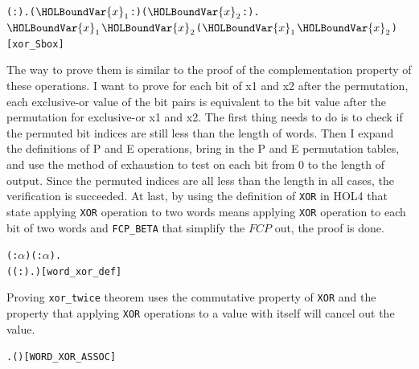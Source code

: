 \documentclass{article}
\begin{document}
\begin{alltt}
  \HOLTokenTurnstile{} \HOLSymConst{\HOLTokenForall{}}( :). \HOLSymConst{\HOLTokenExists{}}(\ensuremath{\HOLBoundVar{x}\sb{\mathrm{1}}} :) (\ensuremath{\HOLBoundVar{x}\sb{\mathrm{2}}} :).
        \HOLSymConst{\HOLTokenImp{}}  \ensuremath{\HOLBoundVar{x}\sb{\mathrm{1}}} \HOLSymConst{\HOLTokenEor{}}  \ensuremath{\HOLBoundVar{x}\sb{\mathrm{2}}} \HOLSymConst{\HOLTokenNotEqual{}}  (\ensuremath{\HOLBoundVar{x}\sb{\mathrm{1}}} \HOLSymConst{\HOLTokenEor{}} \ensuremath{\HOLBoundVar{x}\sb{\mathrm{2}}})\hfill{[xor_Sbox]}
\end{alltt}

The way to prove them is similar to the proof of the complementation property of these operations. I want to prove for each
bit of x1 and x2 after the permutation, each exclusive-or value of the bit pairs is equivalent to the bit value after the
permutation for exclusive-or x1 and x2. The first thing needs to do is to check if the permuted bit indices
are still less than the length of words. Then I expand the definitions of P and E operations, bring in the P and E permutation
tables, and use the method of exhaustion to test on each bit from 0 to the length of output. Since the permuted indices are all
less than the length in all cases, the verification is succeeded. At last, by using the definition of \verb|XOR| in HOL4 that
state applying \verb|XOR| operation to two words means applying \verb|XOR| operation to each bit of two words and \verb|FCP_BETA| that simplify
the $FCP$ out, the proof is done.

\begin{alltt}
  \HOLTokenTurnstile{} \HOLSymConst{\HOLTokenForall{}}( :\ensuremath{\alpha} ) ( :\ensuremath{\alpha} ).
      \HOLSymConst{\HOLTokenEor{}}  \HOLSymConst{=} (( :).    \HOLSymConst{\HOLTokenNotEquiv{}}   )\hfill{[word_xor_def]}
\end{alltt}

Proving \verb|xor_twice| theorem uses the commutative property of \verb|XOR| and the property that applying \verb|XOR| operations
to a value with itself will cancel out the value.

\begin{alltt}
  \HOLTokenTurnstile{} \HOLSymConst{\HOLTokenForall{}}  . ( \HOLSymConst{\HOLTokenEor{}} ) \HOLSymConst{\HOLTokenEor{}}  \HOLSymConst{=}  \HOLSymConst{\HOLTokenEor{}}  \HOLSymConst{\HOLTokenEor{}} \hfill{[WORD_XOR_ASSOC]}
\end{alltt}
\end{document}
